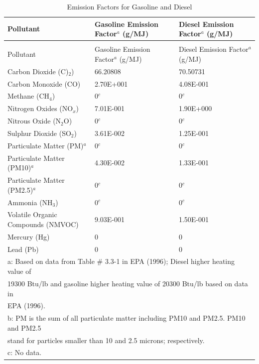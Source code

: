 \begin{longtable}[c]{p{3.0in}p{1.5in}p{1.5in}}
\caption{Emission Factors for Gasoline and Diesel \label{table:emission-factors-for-gasoline-and-diesel}} \tabularnewline
\toprule 
Pollutant & Gasoline Emission Factor\(^a\)   (g/MJ) & Diesel Emission Factor\(^a\)   (g/MJ) \tabularnewline
\midrule
\endfirsthead

\caption[]{Emission Factors for Gasoline and Diesel} \tabularnewline
\toprule 
Pollutant & Gasoline Emission Factor\(^a\)   (g/MJ) & Diesel Emission Factor\(^a\)   (g/MJ) \tabularnewline
\midrule
\endhead

Carbon Dioxide (C)\(_2\)) & 66.20808 & 70.50731 \tabularnewline
Carbon Monoxide (CO) & 2.70E+001 & 4.08E-001 \tabularnewline
Methane (CH\(_4\)) & 0\(^c\) & 0\(^c\) \tabularnewline
Nitrogen Oxides (NO\(_x\)) & 7.01E-001 & 1.90E+000 \tabularnewline
Nitrous Oxide (N\(_2\)O) & 0\(^c\) & 0\(^c\) \tabularnewline
Sulphur Dioxide (SO\(_2\)) & 3.61E-002 & 1.25E-001 \tabularnewline
Particulate Matter (PM)\(^a\) & 0\(^c\) & 0\(^c\) \tabularnewline
Particulate Matter (PM10)\(^a\) & 4.30E-002 & 1.33E-001 \tabularnewline
Particulate Matter (PM2.5)\(^a\) & 0\(^c\) & 0\(^c\) \tabularnewline
Ammonia (NH\(_3\)) & 0\(^c\) & 0\(^c\) \tabularnewline
Volatile Organic Compounds (NMVOC) & 9.03E-001 & 1.50E-001 \tabularnewline
Mercury (Hg) & 0 & 0 \tabularnewline
Lead (Pb) & 0 & 0 \tabularnewline
\midrule
\multicolumn{3}{l}{a: Based on data from Table \# 3.3-1 in EPA (1996); Diesel higher heating value of} \tabularnewline
\multicolumn{3}{l}{19300 Btu/lb and gasoline higher heating value of 20300 Btu/lb based on data in} \tabularnewline
\multicolumn{3}{l}{EPA (1996).} \tabularnewline
\multicolumn{3}{l}{b: PM is the sum of all particulate matter including PM10 and PM2.5. PM10 and PM2.5} \tabularnewline
\multicolumn{3}{l}{stand for particles smaller than 10 and 2.5 microns; respectively.} \tabularnewline
\multicolumn{3}{l}{c: No data.} \tabularnewline
\bottomrule
\end{longtable}

